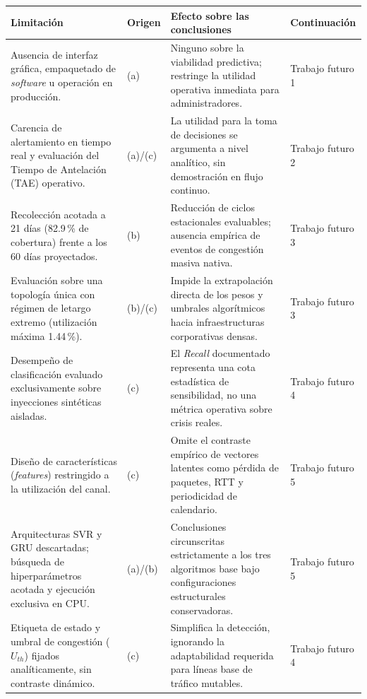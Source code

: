\documentclass[12pt]{report}
\begin{document}
\begin{table}[H]
    \centering
    \small
    \begin{tabular}{|p{4.1cm}|p{1.7cm}|p{4.6cm}|p{2.6cm}|}
        \hline
        \textbf{Limitación} & \textbf{Origen} & \textbf{Efecto sobre las conclusiones} & \textbf{Continuación} \\
        \hline
        Ausencia de interfaz gráfica, empaquetado de \textit{software} u operación en producción. & (a) & Ninguno sobre la viabilidad predictiva; restringe la utilidad operativa inmediata para administradores. & Trabajo futuro 1 \\
        \hline
        Carencia de alertamiento en tiempo real y evaluación del Tiempo de Antelación (TAE) operativo. & (a)/(c) & La utilidad para la toma de decisiones se argumenta a nivel analítico, sin demostración en flujo continuo. & Trabajo futuro 2 \\
        \hline
        Recolección acotada a 21 días (82.9\,\% de cobertura) frente a los 60 días proyectados. & (b) & Reducción de ciclos estacionales evaluables; ausencia empírica de eventos de congestión masiva nativa. & Trabajo futuro 3 \\
        \hline
        Evaluación sobre una topología única con régimen de letargo extremo (utilización máxima 1.44\,\%). & (b)/(c) & Impide la extrapolación directa de los pesos y umbrales algorítmicos hacia infraestructuras corporativas densas. & Trabajo futuro 3 \\
        \hline
        Desempeño de clasificación evaluado exclusivamente sobre inyecciones sintéticas aisladas. & (c) & El \textit{Recall} documentado representa una cota estadística de sensibilidad, no una métrica operativa sobre crisis reales. & Trabajo futuro 4 \\
        \hline
        Diseño de características (\textit{features}) restringido a la utilización del canal. & (c) & Omite el contraste empírico de vectores latentes como pérdida de paquetes, RTT y periodicidad de calendario. & Trabajo futuro 5 \\
        \hline
        Arquitecturas SVR y GRU descartadas; búsqueda de hiperparámetros acotada y ejecución exclusiva en CPU. & (a)/(b) & Conclusiones circunscritas estrictamente a los tres algoritmos base bajo configuraciones estructurales conservadoras. & Trabajo futuro 5 \\
        \hline
        Etiqueta de estado y umbral de congestión ($U_{th}$) fijados analíticamente, sin contraste dinámico. & (c) & Simplifica la detección, ignorando la adaptabilidad requerida para líneas base de tráfico mutables. & Trabajo futuro 4 \\

\end{tabular}
\end{table}
\end{document}
